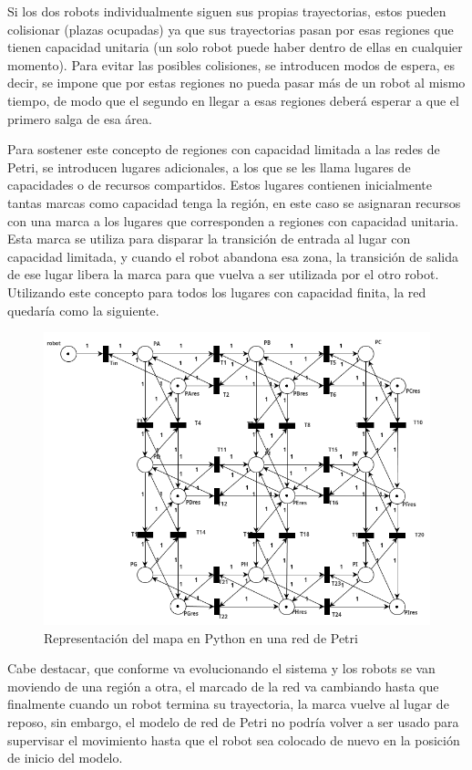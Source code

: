 Si los dos robots individualmente siguen sus propias trayectorias, estos pueden colisionar (plazas ocupadas) ya que sus trayectorias pasan por esas regiones que tienen capacidad unitaria (un solo robot puede haber dentro de ellas en cualquier momento). Para evitar las posibles colisiones, se introducen modos de espera, es decir, se impone que por estas regiones no pueda pasar más de un robot al mismo tiempo, de modo que el segundo en llegar a esas regiones deberá esperar a que el primero salga de esa área.

Para sostener este concepto de regiones con capacidad limitada a las redes de Petri, se introducen lugares adicionales, a los que se les llama lugares de capacidades o de recursos compartidos. Estos lugares contienen inicialmente tantas marcas como capacidad tenga la región, en este caso se asignaran recursos con una marca a los lugares que corresponden a regiones con capacidad unitaria. Esta marca se utiliza para disparar la transición de entrada al lugar con capacidad limitada, y cuando el robot abandona esa zona, la transición de salida de ese lugar libera la marca para que vuelva a ser utilizada por el otro robot. Utilizando este concepto para todos los lugares con capacidad finita, la red quedaría como la siguiente.

\begin{figure}[H]
   \centering
   \includegraphics[width=0.8\linewidth]{images/rdp_no_grid.png}
   \caption{Representación del mapa en Python en una red de Petri}
   \label{fig:rdp_no_grid}
\end{figure}

Cabe destacar, que conforme va evolucionando el sistema y los robots se van moviendo de una región a otra, el marcado de la red va cambiando hasta que finalmente cuando un robot termina su trayectoria, la marca vuelve al lugar de reposo, sin embargo, el modelo de  red de Petri no podría volver a ser usado para supervisar el movimiento hasta que el robot sea colocado de nuevo en la posición de inicio del modelo.

